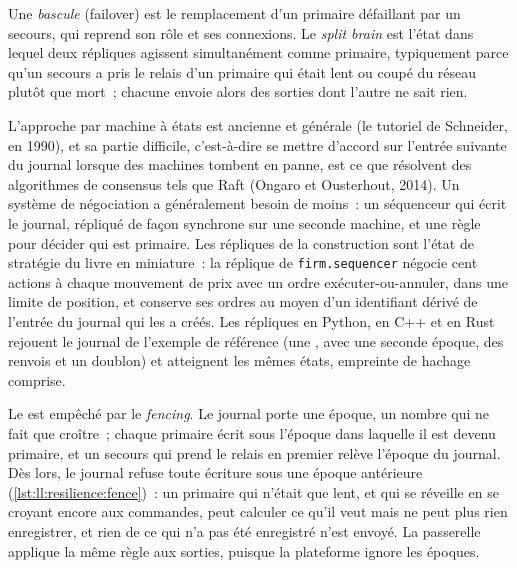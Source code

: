 \begin{definition}\label{def:ll:resilience:failover}
Une \emph{bascule} (failover) est le remplacement d'un primaire défaillant par un secours, qui reprend son
rôle et ses connexions. Le \emph{split brain} est l'état dans lequel deux répliques agissent simultanément comme primaire, typiquement
parce qu'un secours a pris le relais d'un primaire qui était lent ou coupé du réseau plutôt que mort~; chacune envoie alors
des sorties dont l'autre ne sait rien.
\end{definition}

L'approche par machine à états est ancienne et générale (le tutoriel de Schneider, en 1990), et sa partie difficile, c'est-à-dire se mettre d'accord sur
l'entrée suivante du journal lorsque des machines tombent en panne, est ce que résolvent des algorithmes de consensus tels que Raft (Ongaro et Ousterhout, 2014). Un système de négociation
a généralement besoin de moins~: un séquenceur qui écrit le journal, répliqué de façon synchrone sur une seconde machine, et une règle pour
décider qui est primaire. Les répliques de la construction sont l'état de stratégie du livre en miniature~: la réplique de \texttt{firm.sequencer}
négocie cent actions à chaque mouvement de prix avec un ordre exécuter-ou-annuler, dans une limite de position, et conserve
ses ordres au moyen d'un identifiant dérivé de l'entrée du journal qui les a créés. Les répliques en Python, en C++ et en Rust rejouent
le journal de l'exemple de référence (une , avec une seconde époque, des renvois et un doublon) et atteignent les mêmes états, empreinte de hachage comprise.

Le  est empêché par le \emph{fencing}. Le journal porte une époque, un nombre qui ne fait que croître~; chaque primaire écrit sous
l'époque dans laquelle il est devenu primaire, et un secours qui prend le relais en premier relève l'époque du journal. Dès lors, le journal
refuse toute écriture sous une époque antérieure (\cref{lst:ll:resilience:fence})~: un primaire qui n'était que lent, et qui se réveille en se croyant encore
aux commandes, peut calculer ce qu'il veut mais ne peut plus rien enregistrer, et rien de ce qui n'a pas été enregistré
n'est envoyé. La passerelle applique la même règle aux sorties, puisque la plateforme ignore les époques.

\label{lst:ll:resilience:fence}

